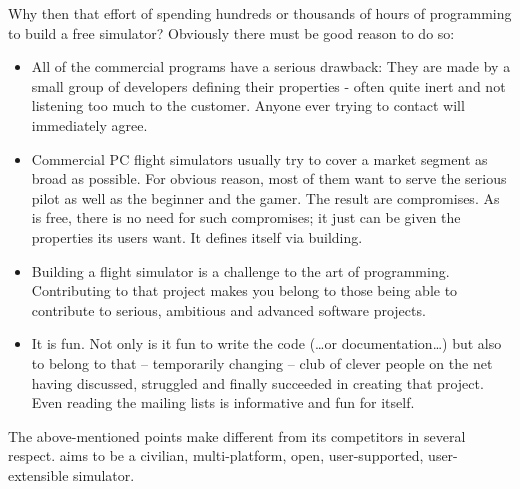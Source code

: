 Why then that effort of spending hundreds or thousands of hours of
programming to build a free simulator? Obviously there must be
good reason to do so:

\begin{itemize}
 \item All of the commercial programs have a serious drawback: They are made
 by a small group of developers defining their properties - often
 quite inert and not listening too much to the customer.
 Anyone ever trying to contact  will
 immediately agree.
 \item Commercial PC flight simulators usually try to cover a market
 segment as broad as possible. For obvious reason, most of them want
 to serve the serious pilot as well as the beginner and the gamer.
 The result are compromises. As \FlightGear is free, there is no need
 for such compromises; it just can be given the properties its users
 want. It defines itself via building.
 \item Building a flight simulator is a challenge to the art of
 programming. Contributing to that project makes you belong to
 those being able to contribute to serious, ambitious and
 advanced software projects.
 \item It is fun. Not only is it fun to write the code (\ldots or
 documentation\ldots) but also to belong to that -- temporarily changing
 -- club of clever people on the net having discussed, struggled and finally
 succeeded in creating that project. Even reading the \FlightGear
 mailing lists is informative and fun for itself.
\end{itemize}

The above-mentioned points make \FlightGear different from its competitors in several
respect. \FlightGear aims to be a civilian,
multi-platform, open,
user-supported, user-extensible simulator.

